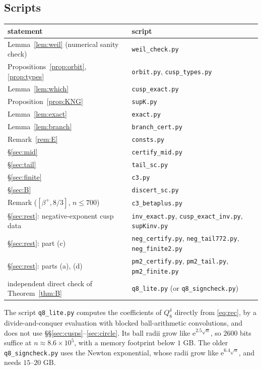 \documentclass[11pt]{amsart}
\theoremstyle{remark}
\theoremstyle{definition}
\newcommand{\e}{\mathrm e}
\begin{document}
\subsection*{Scripts}
\begin{center}
\begin{tabular}{ll}
\toprule
statement & script\\
\midrule
Lemma~\ref{lem:weil} (numerical sanity check) & \texttt{weil\_check.py}\\
Propositions~\ref{prop:orbit}, \ref{prop:types} & \texttt{orbit.py}, \texttt{cusp\_types.py}\\
Lemma~\ref{lem:which} & \texttt{cusp\_exact.py}\\
Proposition~\ref{prop:KNG} & \texttt{supK.py}\\
Lemma~\ref{lem:exact} & \texttt{exact.py}\\
Lemma~\ref{lem:branch} & \texttt{branch\_cert.py}\\
Remark~\ref{rem:E} & \texttt{consts.py}\\
\S\ref{sec:mid} & \texttt{certify\_mid.py}\\
\S\ref{sec:tail} & \texttt{tail\_sc.py}\\
\S\ref{sec:finite} & \texttt{c3.py}\\
\S\ref{sec:B} & \texttt{discert\_sc.py}\\
Remark ($[\beta^+,8/3]$, $n\le700$) & \texttt{c3\_betaplus.py}\\
\S\ref{sec:rest}: negative-exponent cusp data & \texttt{inv\_exact.py}, \texttt{cusp\_exact\_inv.py}, \texttt{supKinv.py}\\
\S\ref{sec:rest}: part (c) & \texttt{neg\_certify.py}, \texttt{neg\_tail772.py}, \texttt{neg\_finite2.py}\\
\S\ref{sec:rest}: parts (a), (d) & \texttt{pm2\_certify.py}, \texttt{pm2\_tail.py}, \texttt{pm2\_finite.py}\\
independent direct check of Theorem~\ref{thm:B} & \texttt{q8\_lite.py} (or \texttt{q8\_signcheck.py})\\
\bottomrule
\end{tabular}
\end{center}
The script \texttt{q8\_lite.py} computes the coefficients of $Q_8^\delta$ directly from \eqref{eq:rec}, by a divide-and-conquer evaluation with blocked ball-arithmetic convolutions, and does not use \S\S\ref{sec:cusps}--\ref{sec:circle}. Its ball radii grow like $\e^{2.5\sqrt n}$, so $2600$ bits suffice at $n\approx8.6\times10^5$, with a memory footprint below $1$ GB. The older \texttt{q8\_signcheck.py} uses the Newton exponential, whose radii grow like $\e^{6.4\sqrt n}$, and needs $15$--$20$ GB.
\end{document}
